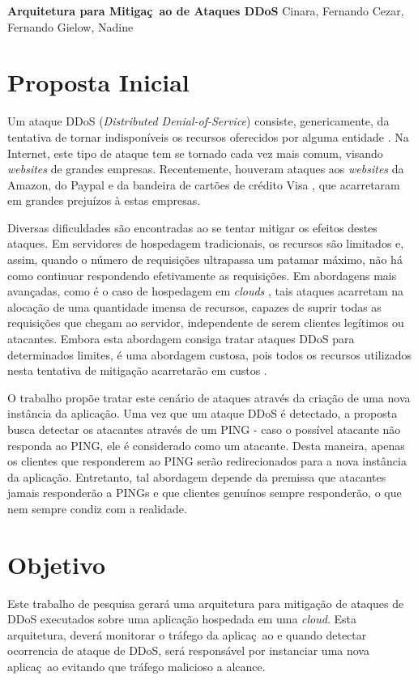 \documentclass[a4paper, 11pt]{article}
\begin{document}
{
\begin{center}
{\LARGE \textbf{Arquitetura para Mitiga\c{c}~{a}o de Ataques DDoS}}
\vskip 0.5cm
{\Large Cinara, Fernando Cezar, Fernando Gielow, Nadine}
\end{center}
}

\section{Proposta Inicial}

Um ataque DDoS (\emph{Distributed Denial-of-Service})
 consiste, genericamente, da tentativa de tornar indisponíveis
os recursos oferecidos por alguma entidade \cite{Zhang:11}. Na Internet, este
tipo de ataque tem se tornado cada vez mais comum, visando \emph{websites} de
grandes empresas. Recentemente, houveram ataques aos \emph{websites} da Amazon,
do Paypal e da bandeira de cartões de crédito Visa \cite{Zuckerman:10}, que
acarretaram em grandes prejuízos à estas empresas.

Diversas dificuldades são encontradas ao se tentar mitigar os efeitos destes
ataques. Em servidores de hospedagem tradicionais, os recursos são limitados e,
assim, quando o número de requisições ultrapassa um patamar máximo, não há como
continuar respondendo efetivamente as requisições. Em abordagens mais avançadas,
como é o caso de hospedagem em \emph{clouds} \cite{Zhang:10}, tais ataques
acarretam na alocação de uma quantidade imensa de recursos, capazes de
suprir todas as requisições que chegam ao servidor, independente de serem
clientes legítimos ou atacantes. Embora esta abordagem consiga tratar ataques
DDoS para determinados limites, é uma abordagem custosa, pois todos os recursos
utilizados nesta tentativa de mitigação acarretar\~ao em custos
\cite{Soon:10}.

O trabalho \cite{Bakshi:10} prop\~oe tratar este cen\'ario de ataques através da
criação de uma nova instância da aplicação. Uma vez que um ataque DDoS é
detectado, a proposta busca detectar os atacantes através de um PING -
caso o possível atacante não responda ao PING, ele é considerado como um
atacante. Desta maneira, apenas os clientes que responderem ao PING serão
redirecionados para a nova instância da aplicação. Entretanto, tal abordagem
depende da premissa que atacantes jamais responderão a PINGs e que clientes
genuínos sempre responderão, o que nem sempre condiz com a realidade. 

\section{Objetivo}
Este trabalho de pesquisa gerar\'a uma arquitetura para mitigação de ataques de
DDoS executados sobre uma aplicação hospedada em uma \emph{cloud}. Esta
arquitetura, dever\'a monitorar o tr\'afego da aplica\c{c}~{a}o e quando
detectar
ocorrencia de ataque de DDoS, ser\'a respons\'avel por instanciar uma nova
aplica\c{c}~{a}o evitando que tr\'afego malicioso a alcance.
\end{document}
